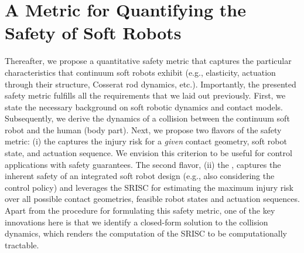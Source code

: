 \section{A Metric for Quantifying the Safety of Soft Robots}
Thereafter, we propose a quantitative safety metric that captures the particular characteristics that continuum soft robots exhibit (e.g., elasticity, actuation through their structure, Cosserat rod dynamics, etc.).
Importantly, the presented safety metric fulfills all the requirements that we laid out previously. %
First, we state the necessary background on soft robotic dynamics and contact models. Subsequently, we derive the dynamics of a collision between the continuum soft robot and the human (body part).
Next, we propose two flavors of the safety metric: (i) the  captures the injury risk for a \emph{given} contact geometry, soft robot state, and actuation sequence. We envision this criterion to be useful for control applications with safety guarantees.
The second flavor, (ii) the , captures the inherent safety of an integrated soft robot design (e.g., also considering the control policy) and leverages the \gls{SRISC} for estimating the maximum injury risk over all possible contact geometries, feasible robot states and actuation sequences.
Apart from the procedure for formulating this safety metric, one of the key innovations here is that we identify a closed-form solution to the collision dynamics, which renders the computation of the \gls{SRISC} to be computationally tractable.

